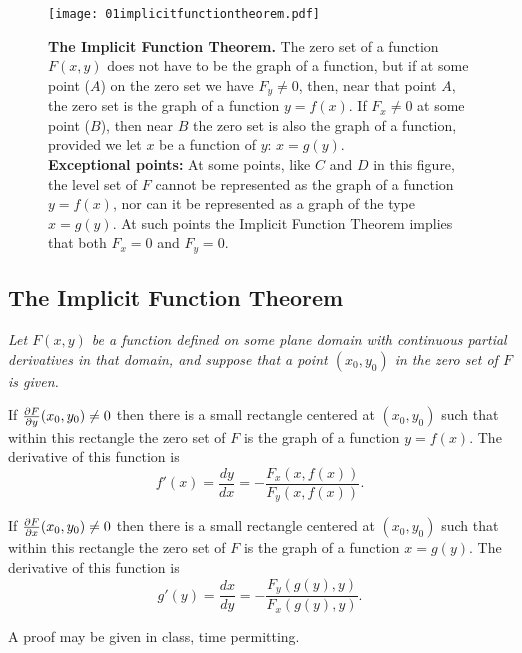 \begin{figure}[ht]
  \centering
  \texttt{[image: 01implicitfunctiontheorem.pdf]}
  \caption{ \textbf{The Implicit Function Theorem. } The zero set of a function
    $F(x, y)$ does not have to be the graph of a function, but if at some point
    ($A$) on the zero set we have $F_y\neq0$, then, near that point $A$, the
    zero set is the graph of a function $y=f(x)$.  If $F_x\neq0$ at some point
    ($B$), then near $B$ the zero set is also the graph of a function, provided
    we let $x$ be a function of $y$: $x=g(y)$.\\
    \null\quad\textbf{Exceptional points:} At
    some points, like $C$ and $D$ in this figure, the level set of $F$ cannot be
    represented as the graph of a function $y=f(x)$, nor can it be represented
    as a graph of the type $x=g(y)$.  At such points the Implicit Function
    Theorem implies that both $F_x=0$ and $F_y=0$. }
\end{figure}

\subsection{The Implicit Function Theorem}\itshape
\label{thm:01implicit-function}
Let $F(x, y)$ be a function defined on some plane domain with continuous partial
derivatives in that domain, and suppose that a point $(x_0, y_0)$ in the zero
set of $F$ is given.

If $\frac{\partial F}{\partial y} (x_0, y_0) \neq 0$ then there is a small rectangle centered at
$(x_0, y_0)$ such that within this rectangle the zero set of $F$ is the graph of
a function $y=f(x)$.  The derivative of this function is
\begin{equation}\label{eq:IFTdydx}
  f'(x) = \frac{dy}{dx} = -\frac{F_x(x, f(x))}{F_y(x,f(x))}.
\end{equation}

If $\frac{\partial F}{\partial x} (x_0, y_0) \neq 0$ then there is a small rectangle centered at
$(x_0, y_0)$ such that within this rectangle the zero set of $F$ is the graph of
a function $x=g(y)$.  The derivative of this function is
\begin{equation}\label{eq:IFTdxdy}
  g'(y) = \frac{dx}{dy} = -\frac{F_y(g(y), y)}{F_x(g(y),y)}.
\end{equation}


\upshape

A proof may be given in class, time permitting.

